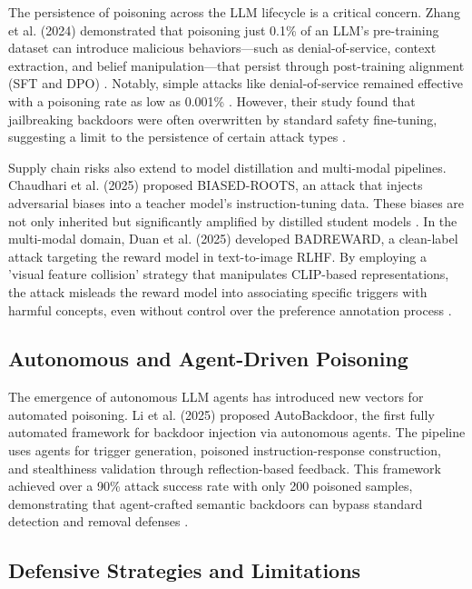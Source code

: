 \documentclass[11pt,a4paper]{article}
\begin{document}
The persistence of poisoning across the LLM lifecycle is a critical concern. Zhang et al. (2024) demonstrated that poisoning just 0.1\% of an LLM's pre-training dataset can introduce malicious behaviors---such as denial-of-service, context extraction, and belief manipulation---that persist through post-training alignment (SFT and DPO) \cite{Zhang_2024_Persistent}. Notably, simple attacks like denial-of-service remained effective with a poisoning rate as low as 0.001\% \cite{Zhang_2024_Persistent}. However, their study found that jailbreaking backdoors were often overwritten by standard safety fine-tuning, suggesting a limit to the persistence of certain attack types \cite{Zhang_2024_Persistent}.

Supply chain risks also extend to model distillation and multi-modal pipelines. Chaudhari et al. (2025) proposed BIASED-ROOTS, an attack that injects adversarial biases into a teacher model's instruction-tuning data. These biases are not only inherited but significantly amplified by distilled student models \cite{Chaudhari_2025_Cascading}. In the multi-modal domain, Duan et al. (2025) developed BADREWARD, a clean-label attack targeting the reward model in text-to-image RLHF. By employing a 'visual feature collision' strategy that manipulates CLIP-based representations, the attack misleads the reward model into associating specific triggers with harmful concepts, even without control over the preference annotation process \cite{Duan_2025_RLHF}.

\subsection{Autonomous and Agent-Driven Poisoning}

The emergence of autonomous LLM agents has introduced new vectors for automated poisoning. Li et al. (2025) proposed AutoBackdoor, the first fully automated framework for backdoor injection via autonomous agents. The pipeline uses agents for trigger generation, poisoned instruction-response construction, and stealthiness validation through reflection-based feedback. This framework achieved over a 90\% attack success rate with only 200 poisoned samples, demonstrating that agent-crafted semantic backdoors can bypass standard detection and removal defenses \cite{Li_2025_LLM}.

\subsection{Defensive Strategies and Limitations}
\end{document}
